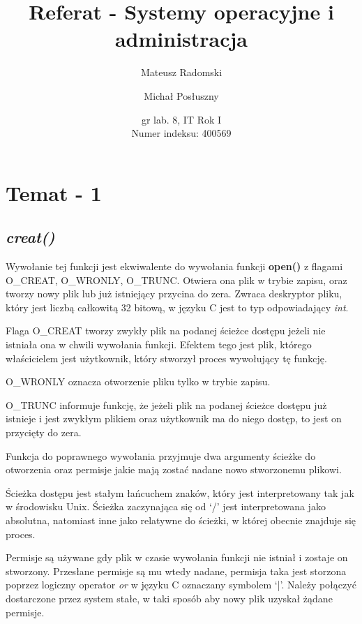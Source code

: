 \documentclass{article}
\title{Referat - Systemy operacyjne i administracja}
\author{Mateusz Radomski \and Michał Posłuszny}
\date{gr lab. 8, IT Rok I \\ Numer indeksu: 400569 }
\begin{document}
\maketitle

\section{Temat - 1}
\subsection{\textit{creat()}}
Wywołanie tej funkcji jest ekwiwalente do wywołania funkcji \textbf{open()} z flagami O\_CREAT, O\_WRONLY, O\_TRUNC. Otwiera ona plik w trybie zapisu, oraz tworzy nowy plik lub już istniejący przycina do zera. Zwraca deskryptor pliku, który jest liczbą całkowitą 32 bitową, w języku C jest to typ odpowiadający \textit{int}.

Flaga O\_CREAT tworzy zwykły plik na podanej ścieżce dostępu jeżeli nie istniała ona w chwili wywołania funkcji. Efektem tego jest plik, którego właścicielem jest użytkownik, który stworzył proces wywołujący tę funkcję.

O\_WRONLY oznacza otworzenie pliku tylko w trybie zapisu.

O\_TRUNC informuje funkcję, że jeżeli plik na podanej ścieżce dostępu już istnieje i jest zwykłym plikiem oraz użytkownik ma do niego dostęp, to jest on przycięty do zera.

Funkcja do poprawnego wywołania przyjmuje dwa argumenty ścieżke do otworzenia oraz permisje jakie mają zostać nadane nowo stworzonemu plikowi.

Ścieżka dostępu jest stałym łańcuchem znaków, który jest interpretowany tak jak w środowisku Unix.
Ścieżka zaczynająca się od `/' jest interpretowana jako absolutna, natomiast inne jako relatywne do
ścieżki, w której obecnie znajduje się proces.

Permisje są używane gdy plik w czasie wywołania funkcji nie istniał i zostaje on stworzony.
Przesłane permisje są mu wtedy nadane, permisja taka jest storzona poprzez logiczny operator
\textit{or} w języku C oznaczany symbolem `|'. Należy połączyć dostarczone przez system stałe,
w taki sposób aby nowy plik uzyskał żądane permisje.
\end{document}
